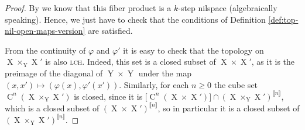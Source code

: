 \documentclass[a4paper,12pt,reqno]{amsart}
\theoremstyle{definition}
\newcommand*{\db}[1]{\llbracket #1\rrbracket}
\DeclareMathOperator{\ns}{X}
\DeclareMathOperator{\nss}{Y}
\DeclareMathOperator{\cu}{C}
\begin{document}
\begin{proof}
By \cite[Lemma 4.2]{CGSS} we know that this fiber product is a
$k$-step nilspace (algebraically speaking). Hence, we just have to check that the conditions of Definition \ref{def:top-nil-open-maps-version} are satisfied.

From the continuity of $\varphi$ and $\varphi'$ it is easy to check that the topology on $\ns \times_{\nss} \ns'$ is also \textsc{lch}. Indeed, this set is a closed subset of $\ns\times\ns'$, as it is the preimage of the diagonal of $\nss\times \nss$ under the map $(x,x')\mapsto(\varphi(x),\varphi'(x'))$. Similarly, for each $n\geq 0$ the cube set $\cu^n(\ns \times_{\nss} \ns')$ is closed, since it is $\big[\cu^n(\ns\times\ns')\big]\cap (\ns \times_{\nss} \ns')^{\db{n}}$, which is a closed subset of $(\ns\times\ns')^{\db{n}}$, so in particular it is a closed subset of $(\ns \times_{\nss} \ns')^{\db{n}}$.


\end{proof}
\end{document}
